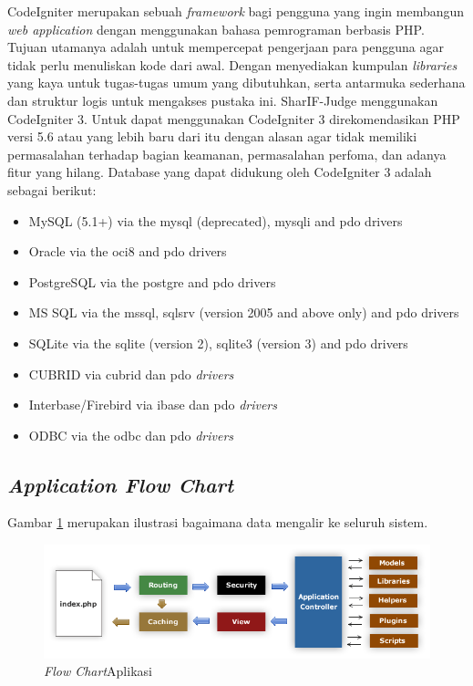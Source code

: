 CodeIgniter merupakan sebuah \textit{framework} bagi pengguna yang ingin membangun \textit{web application} dengan menggunakan bahasa pemrograman berbasis PHP\cite{codeigniter}. Tujuan utamanya adalah untuk mempercepat pengerjaan para pengguna agar tidak perlu menuliskan kode dari awal. Dengan menyediakan kumpulan \textit{libraries} yang kaya untuk tugas-tugas umum yang dibutuhkan, serta antarmuka sederhana dan struktur logis untuk mengakses pustaka ini. SharIF-Judge menggunakan CodeIgniter 3. Untuk dapat menggunakan CodeIgniter 3 direkomendasikan PHP versi 5.6 atau yang lebih baru dari itu dengan alasan agar tidak memiliki permasalahan terhadap bagian keamanan, permasalahan perfoma, dan adanya fitur yang hilang. Database yang dapat didukung oleh CodeIgniter 3 adalah sebagai berikut:
\begin{itemize}
    \item MySQL (5.1+) via the mysql (deprecated), mysqli and pdo drivers
    \item Oracle via the oci8 and pdo drivers
    \item PostgreSQL via the postgre and pdo drivers
    \item MS SQL via the mssql, sqlsrv (version 2005 and above only) and pdo drivers
    \item SQLite via the sqlite (version 2), sqlite3 (version 3) and pdo drivers
    \item CUBRID via cubrid dan pdo \textit{drivers}
    \item Interbase/Firebird via ibase dan pdo \textit{drivers}
    \item ODBC via the odbc dan pdo \textit{drivers} 
\end{itemize}

\subsection{\textit{Application Flow Chart}}
\label{sec: Application Flow Chart}

Gambar \ref{fig:flowchart} merupakan ilustrasi bagaimana data mengalir ke seluruh sistem\cite{codeigniter}.
 \begin{figure}[h!]
     \centering
     \includegraphics[width=0.9\linewidth]{Gambar/appflowchart.png}
     \caption{\textit{Flow Chart}Aplikasi}
     \label{fig:flowchart}
 \end{figure}
 
